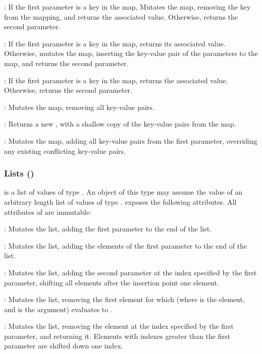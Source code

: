 : If the first parameter is a key in the map, Mutates the
map, removing the key from the mapping, and returns the associated value.
Otherwise, returns the second parameter.

: If the first parameter is a key in the map, returns
its associated value. Otherwise, mutates the map, inserting tke key-value pair
of the parameters to the map, and returns the second parameter.

: If the first parameter is a key in the map, returns the
associated value. Otherwise, returns the second parameter.

: Mutates the map, removing all key-value pairs.

: Returns a new , with a shallow copy
of the key-value pairs from the map.

: Mutates the map, adding all key-value pairs from
the first parameter, overriding any existing conflicting key-value pairs.

\subsubsection{Lists (\code{[T]})}

\code{[T]} is a list of values of type . An object of this type may
assume the value of an arbitrary length list of values of type .
\code{[T]} exposes the following attributes. All attributes of \code{[T]} are
immutable:

: Mutates the list, adding the first parameter to the end
of the list.

: Mutates the list, adding the elements of the first
parameter to the end of the list.

: Mutates the list, adding the second parameter
at the index specified by the first parameter, shifting all elements after
the insertion point one element.

: Mutates the list, removing the first element for which
 (where  is the element, and  is the
argument) evaluates to .

: Mutates the list, removing the element at the index
specified by the first parameter, and returning it. Elements with indexes
greater than the first parameter are shifted down one index.

